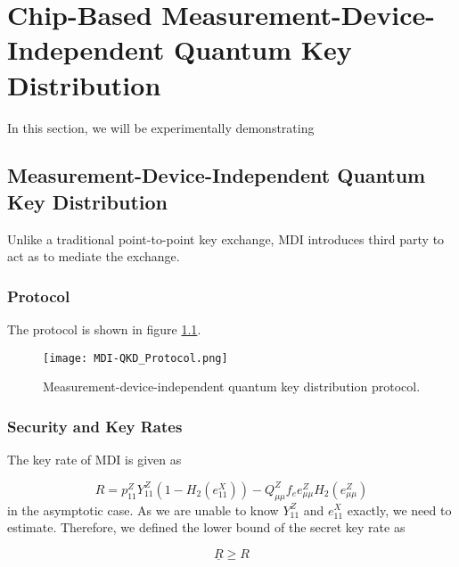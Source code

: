 %
%
\glsresetall
\graphicspath{{./chapters/chapter04/fig04/}}

\let\textcircled=\pgftextcircled
\chapter[Chip-Based Measurement-Device-Independent QKD]{Chip-Based Measurement-Device-Independent Quantum Key Distribution}
\label{chap:mdiqkd}

In this section, we will be experimentally demonstrating 

\section{Measurement-Device-Independent Quantum Key Distribution}
\label{sec:mdi-qkd}

Unlike a traditional point-to-point key exchange, \ac{MDI} introduces third party to act as to mediate the exchange.  

\subsection{Protocol}

The protocol is shown in figure \ref{fig:mdi_protocol}.

\begin{figure}[tbp]
	\centering
	\texttt{[image: MDI-QKD\_Protocol.png]}
	\caption[MDI-QKD protocol]{Measurement-device-independent quantum key distribution protocol.}
	\label{fig:mdi_protocol}
\end{figure}

\subsection{Security and Key Rates}

The key rate of \ac{MDI} is given as

\begin{equation}
	R = p_{11}^Z Y_{11}^Z \left(1 - H_2(e_{11}^X)\right) - Q_{\mu\mu}^Z f_e e_{\mu\mu}^Z H_2(e_{\mu\mu}^Z)
\end{equation}
in the asymptotic case. As we are unable to know $Y_{11}^Z$ and $e_{11}^X$ exactly, we need to estimate. Therefore, we defined the lower bound of the secret key rate as

\begin{equation}
	\underline{R} \geq R
\end{equation}

